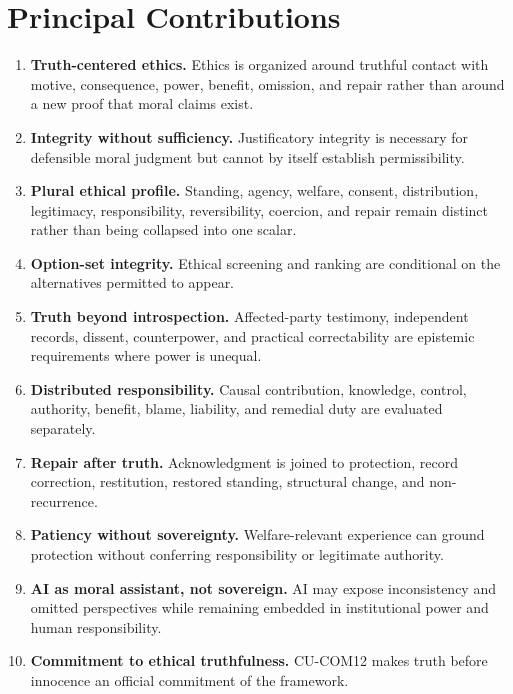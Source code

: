 \documentclass[
  11pt,
]{article}
\providecommand{\tightlist}{%
  \setlength{\itemsep}{0pt}\setlength{\parskip}{0pt}}
\begin{document}
\section{Principal Contributions}\label{principal-contributions}

\begin{enumerate}
\def\labelenumi{\arabic{enumi}.}
\tightlist
\item
  \textbf{Truth-centered ethics.} Ethics is organized around truthful
  contact with motive, consequence, power, benefit, omission, and repair
  rather than around a new proof that moral claims exist.
\item
  \textbf{Integrity without sufficiency.} Justificatory integrity is
  necessary for defensible moral judgment but cannot by itself establish
  permissibility.
\item
  \textbf{Plural ethical profile.} Standing, agency, welfare, consent,
  distribution, legitimacy, responsibility, reversibility, coercion, and
  repair remain distinct rather than being collapsed into one scalar.
\item
  \textbf{Option-set integrity.} Ethical screening and ranking are
  conditional on the alternatives permitted to appear.
\item
  \textbf{Truth beyond introspection.} Affected-party testimony,
  independent records, dissent, counterpower, and practical
  correctability are epistemic requirements where power is unequal.
\item
  \textbf{Distributed responsibility.} Causal contribution, knowledge,
  control, authority, benefit, blame, liability, and remedial duty are
  evaluated separately.
\item
  \textbf{Repair after truth.} Acknowledgment is joined to protection,
  record correction, restitution, restored standing, structural change,
  and non-recurrence.
\item
  \textbf{Patiency without sovereignty.} Welfare-relevant experience can
  ground protection without conferring responsibility or legitimate
  authority.
\item
  \textbf{AI as moral assistant, not sovereign.} AI may expose
  inconsistency and omitted perspectives while remaining embedded in
  institutional power and human responsibility.
\item
  \textbf{Commitment to ethical truthfulness.} CU-COM12 makes truth
  before innocence an official commitment of the framework.
\end{enumerate}
\end{document}
